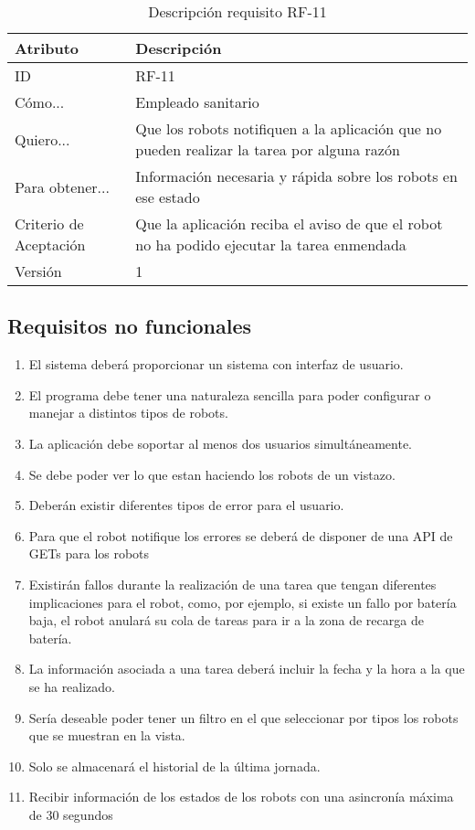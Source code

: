 \begin{table}[H]
    \label{tab:reqF2}
 	\caption{Descripción requisito RF-11}
	\centering

	\begin{tabular}{C{3cm}|C{12cm}}
 		\toprule
 		\textbf{Atributo} & \textbf{Descripción} \\
 		\midrule
 	    ID & RF-11 \\
 	    Cómo... & Empleado sanitario \\
 	    Quiero... & Que los robots notifiquen a la aplicación que no pueden realizar la tarea por alguna razón \\
 	    Para obtener... & Información necesaria y rápida sobre los robots en ese estado  \\
 	    Criterio de Aceptación & Que la aplicación reciba el aviso de que el robot no ha podido ejecutar la tarea enmendada \\
 	    Versión & 1 \\
 		\bottomrule
 		\end{tabular}
\end{table}
\subsection{Requisitos no funcionales}

\begin{enumerate}
  \item El sistema deberá proporcionar un sistema con interfaz de usuario.
  \item El programa debe tener una naturaleza sencilla para poder configurar o manejar a distintos tipos de robots.
  \item La aplicación debe soportar al menos dos usuarios simultáneamente.
  \item Se debe poder ver lo que estan haciendo los robots de un vistazo.
  \item Deberán existir diferentes tipos de error para el usuario.
  \item Para que el robot notifique los errores se deberá de disponer de una API de GETs para los robots
  \item Existirán fallos durante la realización de una tarea que tengan diferentes implicaciones para el robot, como, por ejemplo, si existe un fallo por batería baja, el robot anulará su cola de tareas para ir a la zona de recarga de batería.
  \item La información asociada a una tarea deberá incluir la fecha y la hora a la que se ha realizado.
  \item Sería deseable poder tener un filtro en el que seleccionar por tipos los robots que se muestran en la vista.
  \item Solo se almacenará el historial de la última jornada.
  \item Recibir información de los estados de los robots con una asincronía máxima de 30 segundos

\end{enumerate}